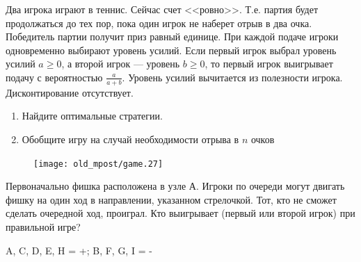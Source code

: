 \begin{problem}
\begin{source}
\cite{lones:dtc}\end{source}
Два игрока играют в теннис. Сейчас счет <<ровно>>. Т.е. партия будет продолжаться до тех пор, пока один игрок не наберет отрыв в два очка. Победитель партии получит приз равный единице. При каждой подаче игроки одновременно выбирают уровень усилий. Если первый игрок выбрал уровень усилий $a\ge 0$, а второй игрок --- уровень $b\ge 0$, то первый игрок выигрывает подачу с вероятностью $\frac{a}{a+b}$. Уровень усилий вычитается из полезности игрока. Дисконтирование отсутствует. \par
\begin{enumerate}
\item  Найдите оптимальные стратегии. \par
\item Обобщите игру на случай необходимости отрыва в $n$ очков \par
\end{enumerate}




\begin{sol}

\end{sol}
\end{problem}



\begin{problem}

\begin{figure}[htbp]
     \texttt{[image: old\_mpost/game.27]}
\end{figure}

Первоначально фишка расположена в узле А. Игроки по очереди могут двигать фишку на один ход в направлении, указанном стрелочкой. Тот, кто не сможет сделать очередной ход, проиграл. Кто выигрывает (первый или второй игрок) при правильной игре?

\begin{sol}
 A, C, D, E, H = +; B, F, G, I = -
\end{sol}
\end{problem}



